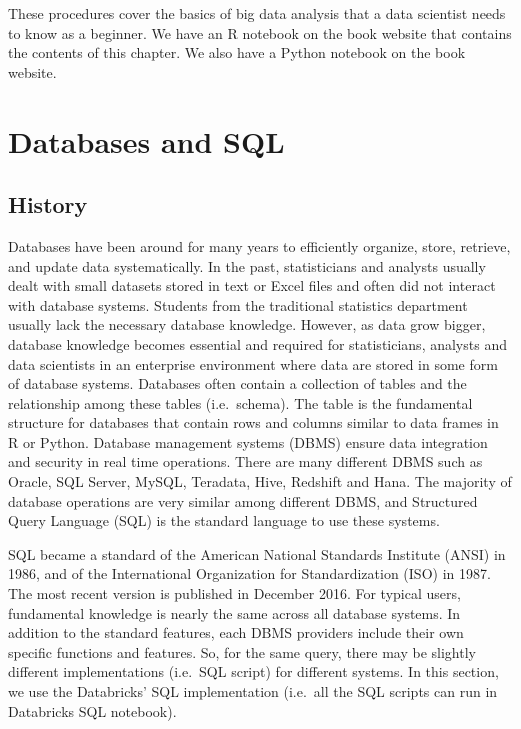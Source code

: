 \documentclass[12pt,]{krantz}
\begin{document}
These procedures cover the basics of big data analysis that a data scientist needs to know as a beginner. We have an R notebook on the book website that contains the contents of this chapter. We also have a Python notebook on the book website.

\hypertarget{databases-and-sql}{%
\section{Databases and SQL}\label{databases-and-sql}}

\hypertarget{history}{%
\subsection{History}\label{history}}

Databases have been around for many years to efficiently organize, store, retrieve, and update data systematically. In the past, statisticians and analysts usually dealt with small datasets stored in text or Excel files and often did not interact with database systems. Students from the traditional statistics department usually lack the necessary database knowledge. However, as data grow bigger, database knowledge becomes essential and required for statisticians, analysts and data scientists in an enterprise environment where data are stored in some form of database systems. Databases often contain a collection of tables and the relationship among these tables (i.e.~schema). The table is the fundamental structure for databases that contain rows and columns similar to data frames in R or Python. Database management systems (DBMS) ensure data integration and security in real time operations. There are many different DBMS such as Oracle, SQL Server, MySQL, Teradata, Hive, Redshift and Hana. The majority of database operations are very similar among different DBMS, and Structured Query Language (SQL) is the standard language to use these systems.

SQL became a standard of the American National Standards Institute (ANSI) in 1986, and of the International Organization for Standardization (ISO) in 1987. The most recent version is published in December 2016. For typical users, fundamental knowledge is nearly the same across all database systems. In addition to the standard features, each DBMS providers include their own specific functions and features. So, for the same query, there may be slightly different implementations (i.e.~SQL script) for different systems. In this section, we use the Databricks' SQL implementation (i.e.~all the SQL scripts can run in Databricks SQL notebook).
\end{document}
